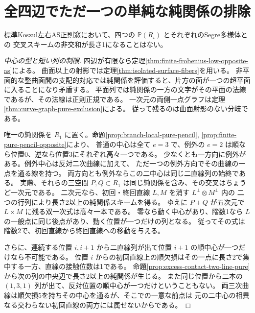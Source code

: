 \section{全四辺でただ一つの単純な純関係の排除}
\label{sec:single-pure-branch-exclusion}
\begin{theorem}\label{thm:single-pure-branch-exclusion}
標準Koszul左右AS正則窓において、四つの $\mathbb P(R_i)$ とそれぞれのSegre多様体との
交叉スキームの非交和が長さ1になることはない。
\end{theorem}
\begin{proof}[中心の型と短い列の制限]
四辺が有限なら定理\ref{thm:finite-frobenius-low-opposite-as}による。
曲面以上の射影では定理\ref{thm:isolated-surface-fibers}を用いる。
非平面的な整曲面間の支配的対応では純関係を評価すると、片方の面が一つの超平面に入ることになり矛盾する。
平面列では純関係の一方の文字がその平面の法線であるが、その法線は正則正規である。
一次元の両側一点グラフは定理\ref{thm:curve-graph-pure-exclusion}による。
従って残るのは曲面射影のない分岐である。

唯一の純関係を $R_1$ に置く。命題\ref{prop:branch-local-pure-pencil}, \ref{prop:finite-pure-pencil-opposite}により、
普通の中心は全て $e=3$ で、例外の $e=2$ は順なら位置0、逆なら位置3にそれぞれ高々一つである。
少なくとも一方向に例外がある。例外中心は反対二次曲線に加えて、
ただ一つの例外方向でその曲線の一点を通る線を持つ。
両方向とも例外ならこの二中心は同じ二直線列の始終である。
実際、それらの三空間 $P,Q\subset R_1$ は同じ純関係を含み、その交叉はちょうど一次元である。
二次元なら、初回・終回直線 $L,M$ を消す $L^\perp\otimes M^\perp$ 内の
二つの行列により長さ2以上の純関係スキームを得る。
ゆえに $P+Q$ が五次元で $L\times M$ に残る双一次式は高々一本である。
零なら動く中心があり、階数1なら $L$ の一般点に同じ後点があり、動く位置が一つだけの列となる。
従ってその式は階数2で、初回直線から終回直線への移動を与える。

さらに、連続する位置 $i,i+1$ から二直線列が出て位置 $i+1$ の順中心が一つだけなら不可能である。
位置 $i$ からの初回直線上の順欠損はその一点に長さ2で集中する一方、直線の接触位数は1である。
命題\ref{prop:excess-contact-two-line-pure}から次の列の中央辺で長さ2以上の純関係が生じる。
また同じ位置から二本の $(1,3,1)$ 列が出て、反対位置の順中心が一つだけということもない。
両三次曲線は順欠損5を持ちその中心を通るが、そこでの一意な前点は
元の二中心の相異なる交わらない初回直線の両方には属せないからである。
\end{proof}

